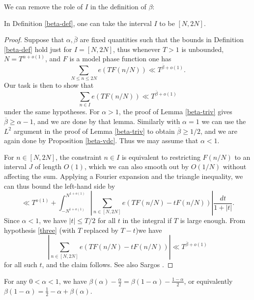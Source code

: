 We can remove the role of $I$ in the definition of $\beta$:

\begin{lemma}\label{interval-set}\leanok  In Definition \ref{beta-def}, one can take the interval $I$ to be $[N,2N]$.
\end{lemma}

\begin{proof}\leanok  Suppose that $\alpha, \overline{\beta}$ are fixed quantities such that the bounds in Definition \ref{beta-def} hold just for $I  = [N,2N]$, thus whenever $T>1$ is unbounded, $N = T^{\alpha+o(1)}$, and $F$ is a model phase function one has
\begin{equation}\label{three}
     \sum_{N \leq n \leq 2N} e(T F(n/N)) \ll T^{\overline{\beta}+o(1)}.
\end{equation}
Our task is then to show that
$$ \sum_{n \in I} e(T F(n/N)) \ll T^{\overline{\beta}+o(1)}$$
under the same hypotheses. For $\alpha>1$, the proof of Lemma \ref{beta-triv} gives $\overline{\beta} \geq \alpha-1$, and we are done by that lemma. Similarly with $\alpha=1$ we can use the $L^2$ argument in the proof of Lemma \ref{beta-triv} to obtain $\overline{\beta} \geq 1/2$, and we are again done by Proposition \ref{beta-vdc}.  Thus we may assume that $\alpha < 1$.

    For $n \in [N,2N]$, the constraint $n \in I$ is equivalent to restricting $F(n/N)$ to an interval $J$ of length $O(1)$, which we can also smooth out by $O(1/N)$ without affecting the sum.  Applying a Fourier expansion and the triangle inequality, we can thus bound the left-hand side by
$$ \ll T^{o(1)} + \int_{-N^{1+o(1)}}^{N^{1+o(1)}} \left|\sum_{n \in [N,2N]} e(T F(n/N) - t F(n/N)) \right| \frac{dt}{1+|t|}.$$
Since $\alpha < 1$, we have $|t| \leq T/2$ for all $t$ in the integral if $T$ is large enough.
From hypothesis \eqref{three} (with $T$ replaced by $T-t$)we have
$$ \left|\sum_{n \in [N,2N]} e(T F(n/N) - t F(n/N)) \right| \ll T^{\overline{\beta}+o(1)}$$
for all such $t$, and the claim follows. See also Sargos \cite[p 310]{sargos_points_1995}.
\end{proof}

\begin{lemma}[Reflection]\label{beta-reflect}\leanok  For any $0 < \alpha < 1$, we have $\beta(\alpha) - \frac{\alpha}{2} = \beta(1-\alpha) - \frac{1-\alpha}{2}$, or equivalently $\beta(1-\alpha) = \frac{1}{2} - \alpha + \beta(\alpha)$.
\end{lemma}

